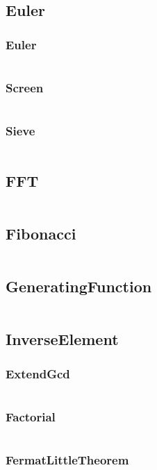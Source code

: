 \documentclass[a4paper,11pt]{article}
\begin{document}
\subsection{Euler}
\subsubsection{Euler}
\inputminted[breaklines]{c++}{02++Math/+Euler/+Euler.cpp}
\subsubsection{Screen}
\inputminted[breaklines]{c++}{02++Math/+Euler/+Screen.cpp}
\subsubsection{Sieve}
\inputminted[breaklines]{c++}{02++Math/+Euler/+Sieve.cpp}

\subsection{FFT}
\inputminted[breaklines]{c++}{02++Math/+FFT.cpp}
\subsection{Fibonacci}
\inputminted[breaklines]{c++}{02++Math/+Fibonacci.cpp}
\subsection{GeneratingFunction}
\inputminted[breaklines]{c++}{02++Math/+GeneratingFunction.cpp}
\subsection{InverseElement}
\subsubsection{ExtendGcd}
\inputminted[breaklines]{c++}{02++Math/+InverseElement/+ExtendGcd.cpp}
\subsubsection{Factorial}
\inputminted[breaklines]{c++}{02++Math/+InverseElement/+Factorial.cpp}
\subsubsection{FermatLittleTheorem}
\inputminted[breaklines]{c++}{02++Math/+InverseElement/+FermatLittleTheorem.cpp}
\end{document}
